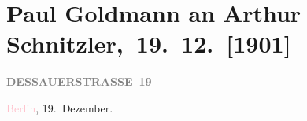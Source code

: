 

\renewcommand{\erwaehntePersonen}{Personen: Richard Beer-Hofmann, Otto Brahm, Hugo von Hofmannsthal, Felix Salten, Gustav Schwarzkopf}
\renewcommand{\erwaehnteOrte}{Orte: Berlin, Dessauer Straße, Wien}
\renewcommand{\erwaehnteWerke}{Werke: Die Frau mit dem Dolche, Lebendige Stunden. Vier Einakter}
\section[ Paul Goldmann an Arthur Schnitzler, 19. 12. {[}1901{]}]{Paul Goldmann an Arthur Schnitzler, 19. 12. {[}1901{]}}
\nopagebreak{}
\rehead{ }\normalsize\beginnumbering{}
\toendnotes[C]{\smallbreak\pagebreak[2]}
\toendnotes[C]{\smallbreak}
\pstart
           \noindent{}\raggedleft{}{\pb}\textcolor{pink}{\textcolor{gray}{\textbf{DESSAUERSTRASSE 19}}}{}\ledrightnote{\textcolor{pink}{Dessauer Straße}}\pend
           
\pstart
           \textcolor{pink}{Berlin}{}\ledrightnote{\textcolor{pink}{Berlin}}, 19. Dezember.\pend
           
